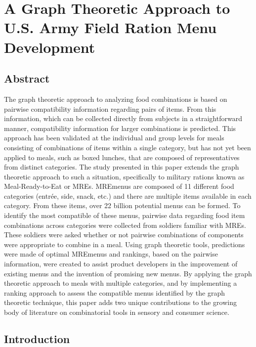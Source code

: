 \chapter{A Graph Theoretic Approach to U.S. Army Field Ration Menu Development}
\section{Abstract}
The graph theoretic approach to analyzing food combinations is based on pairwise compatibility information regarding pairs of items.  From this information, which can be collected directly from subjects in a straightforward manner, compatibility information for larger combinations is predicted.  This approach has been validated at the individual and group levels for meals consisting of combinations of items within a single category, but has not yet been applied to meals, such as boxed lunches, that are composed of representatives from distinct categories.  The study presented in this paper extends the graph theoretic approach to such a situation, specifically to military rations known as Meal-Ready-to-Eat or MREs\tm.  MRE\tm menus are composed of 11 different food categories (entr\'{e}e, side, snack, etc.) and there are multiple items available in each category.  From these items, over 22 billion potential menus can be formed.  To identify the most compatible of these menus, pairwise data regarding food item combinations across categories were collected from soldiers familiar with MREs\tm.  These soldiers were asked whether or not pairwise combinations of components were appropriate to combine in a meal.  Using graph theoretic tools, predictions were made of optimal MRE\tm menus and rankings, based on the pairwise information, were created to assist product developers in the improvement of existing menus and the invention of promising new menus.  By applying the graph theoretic approach to meals with multiple categories, and by implementing a ranking approach to assess the compatible menus identified by the graph theoretic technique, this paper adds two unique contributions to the growing body of literature on combinatorial tools in sensory and consumer science.

\section{Introduction}

